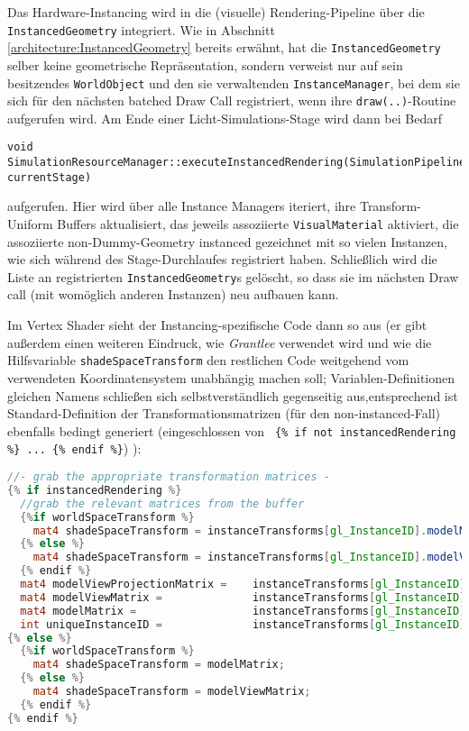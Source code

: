 	Das Hardware-Instancing wird in die (visuelle) Rendering-Pipeline über die \lstinline|InstancedGeometry|
	integriert.	 Wie in Abschnitt \ref{architecture:InstancedGeometry} bereits erwähnt, hat die
	\lstinline|InstancedGeometry| selber keine geometrische Repräsentation, sondern verweist nur auf 
	sein besitzendes \lstinline|WorldObject| und den sie verwaltenden \lstinline|InstanceManager|,
	bei dem sie sich für den nächsten batched Draw Call registriert, 
	wenn ihre \lstinline|draw(..)|-Routine aufgerufen wird.
	Am Ende einer  Licht-Simulations-Stage wird dann bei Bedarf 
\begin{lstlisting}
void SimulationResourceManager::executeInstancedRendering(SimulationPipelineStage* currentStage)
\end{lstlisting}
	aufgerufen. Hier wird über alle Instance Managers iteriert, ihre Transform-Uniform Buffers aktualisiert,
	das jeweils assoziierte \lstinline|VisualMaterial| aktiviert, die assoziierte non-Dummy-Geometry instanced
	gezeichnet mit so vielen Instanzen, wie sich während des Stage-Durchlaufes registriert haben.
	Schließlich wird die Liste an registrierten \lstinline|InstancedGeometry|s gelöscht, so dass sie 
	im nächsten Draw call (mit womöglich anderen Instanzen) neu aufbauen kann.

	Im Vertex Shader sieht der Instancing-spezifische Code dann so aus (er gibt außerdem einen weiteren
	Eindruck, wie \emph{Grantlee} verwendet wird und wie die Hilfsvariable \lstinline|shadeSpaceTransform|
	den restlichen Code weitgehend vom verwendeten Koordinatensystem unabhängig machen soll; 
	Variablen-Definitionen gleichen Namens schließen sich selbstverständlich gegenseitig 
	aus,entsprechend ist Standard-Definition der Transformationsmatrizen (für den non-instanced-Fall) 
	ebenfalls bedingt generiert (eingeschlossen von \lstinline| {% if not instancedRendering %} ... {% endif %}|)  ):
		  
	\begin{lstlisting}[language=GLSL]
//- grab the appropriate transformation matrices -
{% if instancedRendering %}
  //grab the relevant matrices from the buffer
  {%if worldSpaceTransform %}
    mat4 shadeSpaceTransform = instanceTransforms[gl_InstanceID].modelMatrix;
  {% else %}
    mat4 shadeSpaceTransform = instanceTransforms[gl_InstanceID].modelViewMatrix;
  {% endif %}
  mat4 modelViewProjectionMatrix =    instanceTransforms[gl_InstanceID].modelViewProjectionMatrix;   
  mat4 modelViewMatrix =              instanceTransforms[gl_InstanceID].modelViewMatrix;
  mat4 modelMatrix =                  instanceTransforms[gl_InstanceID].modelMatrix;   
  int uniqueInstanceID =              instanceTransforms[gl_InstanceID].uniqueInstanceID;
{% else %}
  {%if worldSpaceTransform %}
    mat4 shadeSpaceTransform = modelMatrix;
  {% else %}
    mat4 shadeSpaceTransform = modelViewMatrix;
  {% endif %}
{% endif %}		
	\end{lstlisting}
	
